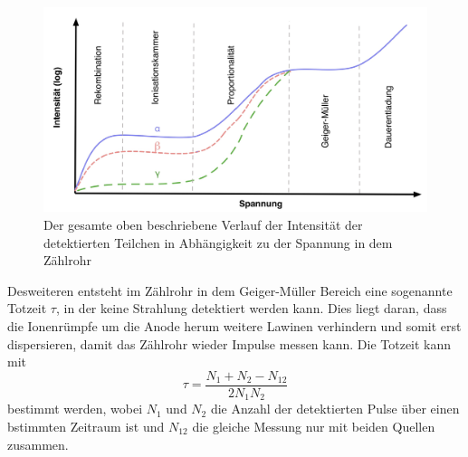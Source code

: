 \begin{figure}[H]
    \includegraphics[width=\textwidth]{Bilder/intensitaetsverlauf.png}
    \caption{Der gesamte oben beschriebene Verlauf der Intensität der detektierten Teilchen in Abhängigkeit zu der Spannung
    in dem Zählrohr}
    \label{fig:intens}
\end{figure}

\noindent Desweiteren entsteht im Zählrohr in dem Geiger-Müller Bereich eine sogenannte Totzeit $\tau$, in der keine
Strahlung detektiert werden kann. Dies liegt daran, dass die Ionenrümpfe um die Anode herum weitere Lawinen verhindern
und somit erst dispersieren, damit das Zählrohr wieder Impulse messen kann. Die Totzeit kann mit
\begin{equation}
    \tau=\frac{N_1+N_2-N_{12}}{2N_1N_2}
    \label{eqn:totzeit}
\end{equation}
bestimmt werden, wobei $N_1$ und $N_2$ die Anzahl der detektierten Pulse über einen bstimmten Zeitraum ist
und $N_{12}$ die gleiche Messung nur mit beiden Quellen zusammen.

\cite{V703}